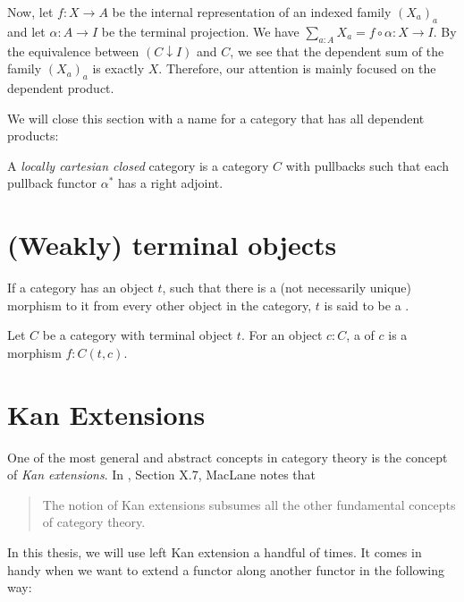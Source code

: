 Now, let $ f : X \to A $ be the internal representation of an indexed family $ (X_a)_a $ and let $ \alpha : A \to I $ be the terminal projection. We have $ \sum_{a : A} X_a = f \circ \alpha : X \to I $. By the equivalence between $ (C \downarrow I) $ and $ C $, we see that the dependent sum of the family $ (X_a)_a $ is exactly $ X $. Therefore, our attention is mainly focused on the dependent product.

We will close this section with a name for a category that has all dependent products:

\begin{definition}
  A \textit{locally cartesian closed} category is a category $ C $ with pullbacks such that each pullback functor $ \alpha^* $ has a right adjoint.
\end{definition}

\section{(Weakly) terminal objects}
\begin{definition}
  If a category has an object $ t $, such that there is a (not necessarily unique) morphism to it from every other object in the category, $ t $ is said to be a .
\end{definition}

\begin{definition}
  Let $ C $ be a category with terminal object $ t $. For an object $ c: C $, a  of $ c $ is a morphism $ f: C(t, c) $.
\end{definition}


\section{Kan Extensions}
One of the most general and abstract concepts in category theory is the concept of \textit{Kan extensions}. In \cite{MacLane}, Section X.7, MacLane notes that
\begin{quote}
  The notion of Kan extensions subsumes all the other fundamental concepts of category theory.
\end{quote}
In this thesis, we will use left Kan extension a handful of times. It comes in handy when we want to extend a functor along another functor in the following way:

